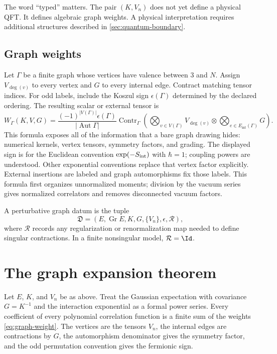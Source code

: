 \documentclass[11pt,a4paper]{article}
\newcommand{\Aut}{\operatorname{Aut}}
\newcommand{\Gr}{\operatorname{Gr}}
\begin{document}
The word ``typed'' matters.  The pair \((K,V_n)\) does not yet define a
physical QFT.  It defines algebraic graph weights.  A physical
interpretation requires additional structures described in
\cref{sec:quantum-boundary}.

\subsection{Graph weights}

Let \(\Gamma\) be a finite graph whose vertices have valence between \(3\)
and \(N\).  Assign \(V_{\deg(v)}\) to every vertex and \(G\) to every
internal edge.  Contract matching tensor indices.  For odd labels, include
the Koszul sign \(\epsilon(\Gamma)\) determined by the declared ordering.
The resulting scalar or external tensor is
\begin{equation}
 W_\Gamma(K,V,G)
 =
 \frac{(-1)^{|V(\Gamma)|}\epsilon(\Gamma)}{|\Aut\Gamma|}
 \operatorname{Contr}_\Gamma
 \left(
 \bigotimes_{v\in V(\Gamma)}V_{\deg(v)}
 \otimes
 \bigotimes_{e\in E_{\mathrm{int}}(\Gamma)}G
 \right).
 \label{eq:graph-weight}
\end{equation}
This formula exposes all of the information that a bare graph drawing
hides: numerical kernels, vertex tensors, symmetry factors, and grading.
The displayed sign is for the Euclidean convention
$\exp(-S_{\rm int})$ with $\hbar=1$; coupling powers are understood.
Other exponential conventions replace that vertex factor explicitly.
External insertions are labeled and graph automorphisms fix those labels.
This formula first organizes unnormalized moments; division by the vacuum
series gives normalized correlators and removes disconnected vacuum factors.

\begin{definition}
A perturbative graph datum is the tuple
\[
 \mathfrak D=(E,\Gr E,K,G,\{V_n\},\epsilon,\mathcal R),
\]
where \(\mathcal R\) records any regularization or renormalization map
needed to define singular contractions.  In a finite nonsingular model,
\(\mathcal R=\Id\).
\end{definition}

\section{The graph expansion theorem}

\begin{theorem}
\label{thm:wick-graph}
Let \(E\), \(K\), and \(V_n\) be as above.  Treat the Gaussian expectation
with covariance \(G=K^{-1}\) and the interaction exponential as a formal
power series.  Every coefficient of every polynomial correlation
function is a finite sum of the weights \eqref{eq:graph-weight}.  The
vertices are the tensors \(V_n\), the internal edges are contractions by
\(G\), the automorphism denominator gives the symmetry factor, and the
odd permutation convention gives the fermionic sign.
\end{theorem}
\end{document}
